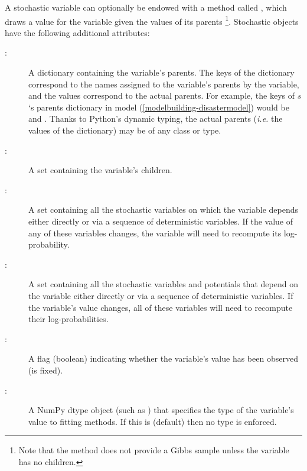 \documentclass[letterpaper,10pt,english]{sphinxmanual}
\begin{document}
A stochastic variable can optionally be endowed with a method called , which draws a value for the variable given the values of its parents \footnote{
Note that the  method does not provide a Gibbs sample unless the
variable has no children.
}. Stochastic objects have the following additional attributes:
\begin{description}
\item[{:}] \leavevmode
A dictionary containing the variable's parents. The keys of the dictionary
correspond to the names assigned to the variable's parents by the variable,
and the values correspond to the actual parents. For example, the keys of
$s$`s parents dictionary in model (\eqref{modelbuilding-disastermodel}) would be
 and . Thanks to Python's dynamic typing, the actual
parents (\emph{i.e.} the values of the dictionary) may be of any class or type.

\item[{:}] \leavevmode
A set containing the variable's children.

\item[{:}] \leavevmode
A set containing all the stochastic variables on which the variable depends
either directly or via a sequence of deterministic variables. If the value
of any of these variables changes, the variable will need to recompute its
log-probability.

\item[{:}] \leavevmode
A set containing all the stochastic variables and potentials that depend on
the variable either directly or via a sequence of deterministic variables.
If the variable's value changes, all of these variables will need to
recompute their log-probabilities.

\item[{:}] \leavevmode
A flag (boolean) indicating whether the variable's value has been observed
(is fixed).

\item[{:}] \leavevmode
A NumPy dtype object (such as ) that specifies the type of the
variable's value to fitting methods. If this is  (default) then no
type is enforced.

\end{description}
\end{document}
